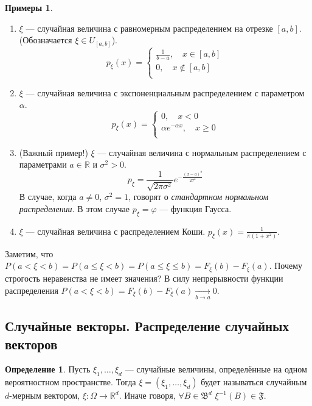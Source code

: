 \documentclass[11pt,openany,a4paper]{scrartcl}
\theoremstyle{plain}
\theoremstyle{definition}
\newtheorem{definition}[theorem]{Определение}
\newtheorem{examples}[theorem]{Примеры}
\newcommand\mb{\mathbb}
\newcommand\real{\mb R}
\newcommand{\underto}[1]{\xrightarrow[#1]{}}
\begin{document}
\begin{examples}
    \begin{enumerate}
        \item $\xi$ — случайная величина с равномерным распределением на
        отрезке $[a,b]$. (Обозначается $\xi \in U_{[a,b]}$).
        $$
        p_\xi (x) =
        \begin{cases}
            \frac{1}{b-a},\quad x \in [a,b] \\
            0, \quad x \notin [a,b] \\
        \end{cases}
        $$
        \item $\xi$ — случайная величина с экспоненциальным распределением с 
        параметром $\alpha$.
        $$
        p_\xi(x) =
        \begin{cases}
            0,\quad x < 0 \\
            \alpha e^{-\alpha x},\quad x \geqslant 0 \\
        \end{cases}
        $$
        \item (Важный пример!) $\xi$ — случайная величина с нормальным 
        распределением с параметрами $a \in \real$ и $\sigma^2 > 0$.
        $$
        p_\xi = \frac{1}{\sqrt{2\pi \sigma^2}}e^{- \frac{(x - a)^2}{2\sigma^2}}
        $$
        В случае, когда $a \neq 0$, $\sigma^2 = 1$, говорят о \emph{стандартном 
        нормальном распределении}.
        В этом случае $p_\xi = \varphi$ — функция Гаусса.
        \item $\xi$ — случайная величина с распределением Коши.
        $p_\xi(x) = \frac{1}{\pi (1 + x^2)}$.
    \end{enumerate}
\end{examples}

Заметим, что $P(a < \xi < b) = P(a \leqslant \xi < b) =
P(a \leqslant \xi \leqslant b) = F_\xi(b) - F_\xi(a)$. Почему строгость неравенства
не имеет значения? В силу непрерывности функции распределения
$P(a < \xi < b) = F_\xi(b) - F_\xi(a) \underto{b \to a} 0$.

\subsection{Случайные векторы. Распределение случайных векторов}

\begin{definition}
    Пусть $\xi_1, \ldots, \xi_d$ — случайные величины, определённые на одном
    вероятностном пространстве. Тогда $\xi = (\xi_1, \ldots, \xi_d)$ будет
    называться случайным $d$-мерным вектором, $\xi: \Omega \to \real^d$.
    Иначе говоря, $\forall B \in \mathfrak B^d$ $\xi^{-1}(B) \in \mathfrak F$.
\end{definition}
\end{document}
